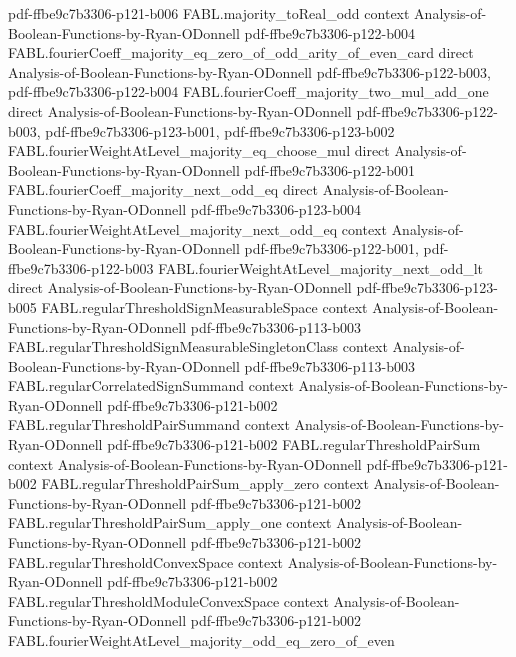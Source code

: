 \begin{theorem}
  {pdf-ffbe9c7b3306-p121-b006}
\proofstep
  {FABL.majority_toReal_odd}
  {context}
  {Analysis-of-Boolean-Functions-by-Ryan-ODonnell}
  {pdf-ffbe9c7b3306-p122-b004}
\proofstep
  {FABL.fourierCoeff_majority_eq_zero_of_odd_arity_of_even_card}
  {direct}
  {Analysis-of-Boolean-Functions-by-Ryan-ODonnell}
  {pdf-ffbe9c7b3306-p122-b003,
    pdf-ffbe9c7b3306-p122-b004}
\proofstep
  {FABL.fourierCoeff_majority_two_mul_add_one}
  {direct}
  {Analysis-of-Boolean-Functions-by-Ryan-ODonnell}
  {pdf-ffbe9c7b3306-p122-b003,
    pdf-ffbe9c7b3306-p123-b001,
    pdf-ffbe9c7b3306-p123-b002}
\proofstep
  {FABL.fourierWeightAtLevel_majority_eq_choose_mul}
  {direct}
  {Analysis-of-Boolean-Functions-by-Ryan-ODonnell}
  {pdf-ffbe9c7b3306-p122-b001}
\proofstep
  {FABL.fourierCoeff_majority_next_odd_eq}
  {direct}
  {Analysis-of-Boolean-Functions-by-Ryan-ODonnell}
  {pdf-ffbe9c7b3306-p123-b004}
\proofstep
  {FABL.fourierWeightAtLevel_majority_next_odd_eq}
  {context}
  {Analysis-of-Boolean-Functions-by-Ryan-ODonnell}
  {pdf-ffbe9c7b3306-p122-b001,
    pdf-ffbe9c7b3306-p122-b003}
\proofstep
  {FABL.fourierWeightAtLevel_majority_next_odd_lt}
  {direct}
  {Analysis-of-Boolean-Functions-by-Ryan-ODonnell}
  {pdf-ffbe9c7b3306-p123-b005}
\proofstep
  {FABL.regularThresholdSignMeasurableSpace}
  {context}
  {Analysis-of-Boolean-Functions-by-Ryan-ODonnell}
  {pdf-ffbe9c7b3306-p113-b003}
\proofstep
  {FABL.regularThresholdSignMeasurableSingletonClass}
  {context}
  {Analysis-of-Boolean-Functions-by-Ryan-ODonnell}
  {pdf-ffbe9c7b3306-p113-b003}
\proofstep
  {FABL.regularCorrelatedSignSummand}
  {context}
  {Analysis-of-Boolean-Functions-by-Ryan-ODonnell}
  {pdf-ffbe9c7b3306-p121-b002}
\proofstep
  {FABL.regularThresholdPairSummand}
  {context}
  {Analysis-of-Boolean-Functions-by-Ryan-ODonnell}
  {pdf-ffbe9c7b3306-p121-b002}
\proofstep
  {FABL.regularThresholdPairSum}
  {context}
  {Analysis-of-Boolean-Functions-by-Ryan-ODonnell}
  {pdf-ffbe9c7b3306-p121-b002}
\proofstep
  {FABL.regularThresholdPairSum_apply_zero}
  {context}
  {Analysis-of-Boolean-Functions-by-Ryan-ODonnell}
  {pdf-ffbe9c7b3306-p121-b002}
\proofstep
  {FABL.regularThresholdPairSum_apply_one}
  {context}
  {Analysis-of-Boolean-Functions-by-Ryan-ODonnell}
  {pdf-ffbe9c7b3306-p121-b002}
\proofstep
  {FABL.regularThresholdConvexSpace}
  {context}
  {Analysis-of-Boolean-Functions-by-Ryan-ODonnell}
  {pdf-ffbe9c7b3306-p121-b002}
\proofstep
  {FABL.regularThresholdModuleConvexSpace}
  {context}
  {Analysis-of-Boolean-Functions-by-Ryan-ODonnell}
  {pdf-ffbe9c7b3306-p121-b002}
\proofstep
  {FABL.fourierWeightAtLevel_majority_odd_eq_zero_of_even}

\end{theorem}
